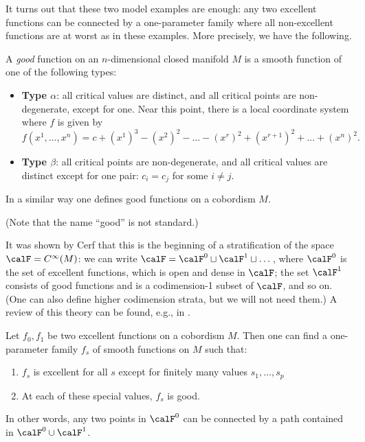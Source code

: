 It turns out that these two model examples are enough: any two excellent
functions can be connected by a one-parameter family where all non-excellent
functions are at worst as in these examples. More precisely, we have the
following.

\begin{definition}\label{d:morse-good}
  A \emph{good} function on an $n$-dimensional closed manifold $M$ is a
  smooth function of one of the following types:
  \begin{itemize}
    \item {\bf Type $\alpha$}: all critical values are distinct, and all
      critical points are non-degenerate, except for one. Near this point,
      there is a local coordinate system where $f$ is given by
      $$
      f(x^1, \dots, x^n)=c+(x^1)^3 -(x^2)^2-\dots -(x^r)^2+(x^{r+1})^2 +
                        \dots +(x^n)^2.
      $$
    \item {\bf Type $\beta$}: all critical points are non-degenerate, and
      all critical values are distinct except for one pair: $c_i = c_j$
      for some $i\ne j$.
  \end{itemize}
  In a similar way one defines good functions on a cobordism $M$.
\end{definition}

(Note that the name ``good'' is not standard.)

It was shown by Cerf that this is the beginning of a stratification of the
space $\calF=C^\infty(M)$: we can write
$\calF = \calF^0\sqcup \calF^1\sqcup\dots$,
where $\calF^0$ is the set of excellent functions, which is open and dense in
$\calF$; the set $\calF^1$ consists of good functions and is a codimension-1
subset of $\calF$, and so on. (One can also define higher codimension strata,
but we will not need them.) A review of this theory can be found, e.g., in
\cite[Section I.2]{hatcher-wagoner}.

\begin{theorem}\label{t:cerf1}
  Let $f_0, f_1$ be two excellent functions on a cobordism $M$. Then one can
  find a one-parameter family $f_s$ of smooth functions on $M$ such that:
  \begin{enumerate}
    \item $f_s$ is excellent for all $s$ except for finitely
      many values $s_1, \dots, s_p$
    \item At each of these special values, $f_s$ is good.
  \end{enumerate}
\end{theorem}
In other words, any two points in $\calF^0$ can be connected by a path
contained in $\calF^0\cup \calF^1$.

